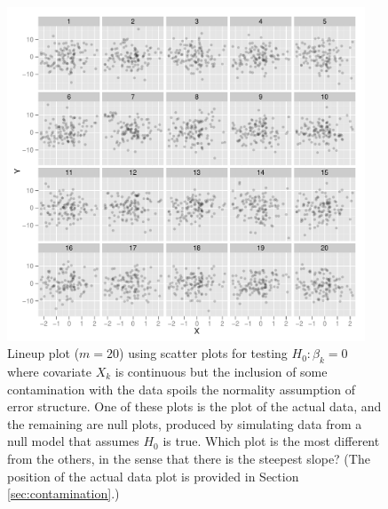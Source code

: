 \documentclass[12pt]{article}
\newcommand{\green}[1]{{\color{green} #1}} %
\begin{document}
\begin{figure}[p]
   \centering
       \includegraphics[width=0.95\textwidth]{lineup_contaminated.pdf}
       \caption{Lineup plot ($m=20$) using scatter plots for testing $H_0: \beta_k=0$ where covariate $X_k$ is continuous but the inclusion of some contamination with the data spoils the normality assumption of error structure. One of these plots is the plot of the actual data, and the remaining are null plots, produced by simulating data from a null model that assumes $H_0$ is true. Which plot is the most different from the others, in the sense that there is the steepest slope? (The position of the actual data plot is provided in Section \ref{sec:contamination}.)}
       \label{fig:test_contaminated}
\end{figure}



\end{document}
